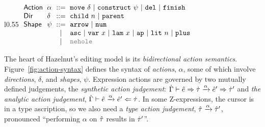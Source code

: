 \begin{wrapfigure}{l}{0.55\textwidth}
\small 
\hspace{-3px}$\arraycolsep=3pt\begin{array}{llcllll}
\mathsf{Action} & \alpha & ::= &
  \aMove{\delta} ~\vert~
  \aConstruct{\psi} ~\vert~
  \aDel ~\vert~
  \aFinish\\
\mathsf{Dir} & \delta & ::= &
  \dChildnm{n} ~\vert~
  \dParent\\
\mathsf{Shape} & \psi & ::= &
  \farr ~\vert~
  \fnum \\
& & \vert &
  \fasc ~\vert~
  \fvar{x} ~\vert~
  \flam{x} ~\vert~
  \fap ~\vert~
  \fnumlit{n} ~\vert~
  \fplus\\
& & \vert &
  {\color{gray}\fnehole}
\end{array}$
\caption{Syntax of actions.}
\label{fig:action-syntax}
\end{wrapfigure}
The heart of Hazelnut's editing model is its \emph{bidirectional action
  semantics}.  Figure~\ref{fig:action-syntax} defines the syntax of
\emph{actions}, $\alpha$, some of which involve \emph{directions},
$\delta$, and \emph{shapes}, $\psi$. Expression actions are governed by two mutually defined judgements, the
\emph{synthetic action judgement}:
$\dot{\Gamma} \vdash \hat{e} \Rightarrow \dot{\tau} \xrightarrow{\alpha} \hat{e}' \Rightarrow \dot{\tau}'$
and \emph{the analytic action judgement}, 
$\dot{\Gamma} \vdash \hat{e} \xrightarrow{\alpha} \hat{e}' \Leftarrow \dot{\tau}$. 
In some Z-expressions, the cursor is in a type ascription, so we also need
a \emph{type action judgement}, $\hat{\tau} \xrightarrow{\alpha} \hat{\tau}'$, pronounced ``performing $\alpha$ on $\hat{\tau}$
results in $\hat{\tau}'$''.


